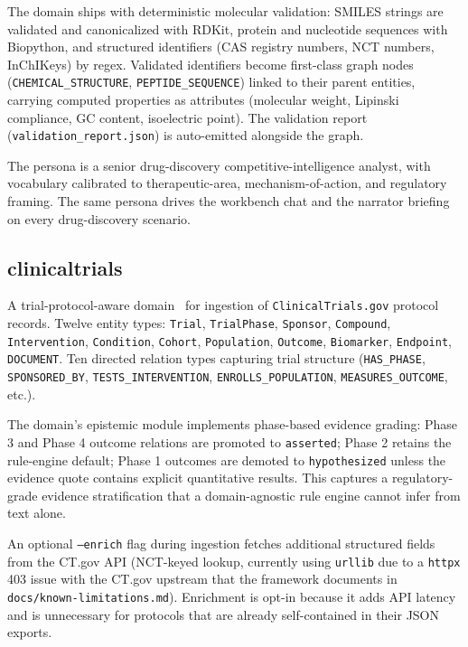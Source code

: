 The domain ships with deterministic molecular validation: SMILES strings are validated and canonicalized with RDKit, protein and nucleotide sequences with Biopython, and structured identifiers (CAS registry numbers, NCT numbers, InChIKeys) by regex. Validated identifiers become first-class graph nodes (\texttt{CHEMICAL\_STRUCTURE}, \texttt{PEPTIDE\_SEQUENCE}) linked to their parent entities, carrying computed properties as attributes (molecular weight, Lipinski compliance, GC content, isoelectric point). The validation report (\texttt{validation\_report.json}) is auto-emitted alongside the graph.

The persona is a senior drug-discovery competitive-intelligence analyst, with vocabulary calibrated to therapeutic-area, mechanism-of-action, and regulatory framing. The same persona drives the workbench chat and the narrator briefing on every drug-discovery scenario.

\subsection{clinicaltrials}
\label{sec:domain-clinicaltrials}

A trial-protocol-aware domain~\cite{davidson2026clinicaltrials} for ingestion of \texttt{ClinicalTrials.gov} protocol records. Twelve entity types: \texttt{Trial}, \texttt{TrialPhase}, \texttt{Sponsor}, \texttt{Compound}, \texttt{Intervention}, \texttt{Condition}, \texttt{Cohort}, \texttt{Population}, \texttt{Outcome}, \texttt{Biomarker}, \texttt{Endpoint}, \texttt{DOCUMENT}. Ten directed relation types capturing trial structure (\texttt{HAS\_PHASE}, \texttt{SPONSORED\_BY}, \texttt{TESTS\_INTERVENTION}, \texttt{ENROLLS\_POPULATION}, \texttt{MEASURES\_OUTCOME}, etc.).

The domain's epistemic module implements phase-based evidence grading: Phase 3 and Phase 4 outcome relations are promoted to \texttt{asserted}; Phase 2 retains the rule-engine default; Phase 1 outcomes are demoted to \texttt{hypothesized} unless the evidence quote contains explicit quantitative results. This captures a regulatory-grade evidence stratification that a domain-agnostic rule engine cannot infer from text alone.

An optional \texttt{--enrich} flag during ingestion fetches additional structured fields from the CT.gov API (NCT-keyed lookup, currently using \texttt{urllib} due to a \texttt{httpx} 403 issue with the CT.gov upstream that the framework documents in \texttt{docs/known-limitations.md}). Enrichment is opt-in because it adds API latency and is unnecessary for protocols that are already self-contained in their JSON exports.

